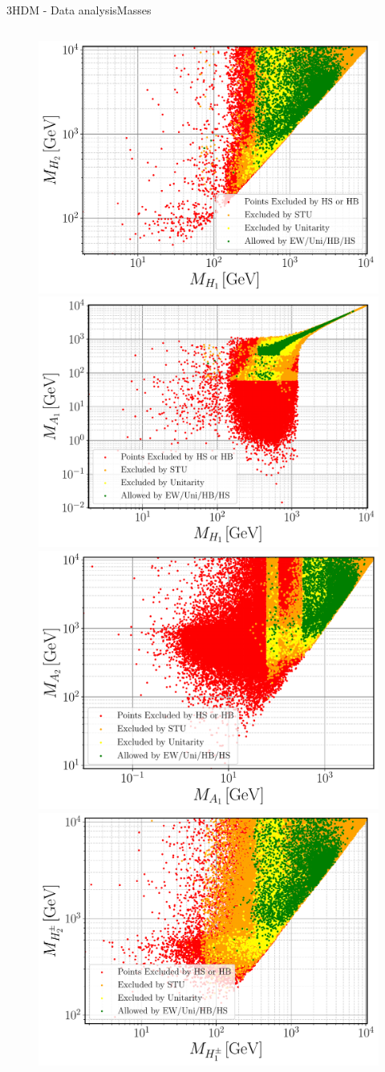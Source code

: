 \documentclass[10pt,xcolor=dvipsnames,mathserif]{beamer}
\begin{document}
\begin{frame}{3HDM - Data analysis}{Masses}
\begin{columns}
\begin{column}{0.7\textwidth}

    \begin{figure}[!htb]
	\centering
	\includegraphics[width=.49\textwidth]{H1_H2_Color_Exclusions_Without_QFV.pdf}
	\includegraphics[width=.49\textwidth]{H1_A1_Color_Exclusions_Without_QFV.pdf}
	\includegraphics[width=.49\textwidth]{A1_A2_Color_Exclusions_Without_QFV.pdf}
	\includegraphics[width=.49\textwidth]{Hc1_Hc2_Color_Exclusions_Without_QFV.pdf}

\end{figure}
\end{column}
\end{columns}
\end{frame}
\end{document}
